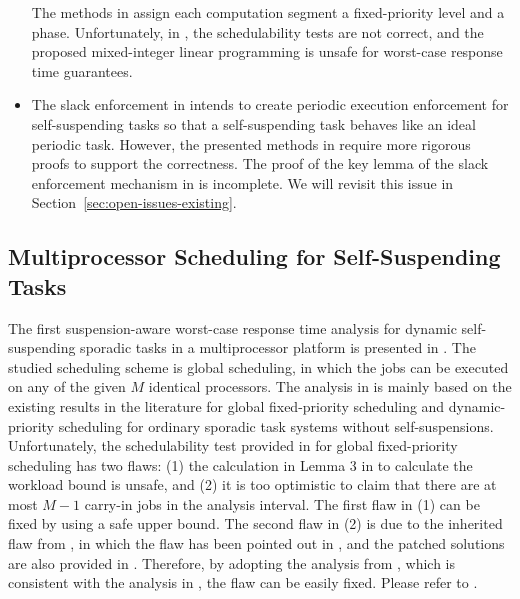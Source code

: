 \begin{table}[t]
\begin{table}[t]
\begin{itemize}
The methods in \cite{RTSS-KimANR13,DBLP:journals/ieicet/DingTT09} assign each computation segment a fixed-priority level and a phase. Unfortunately,  in \cite{RTSS-KimANR13,DBLP:journals/ieicet/DingTT09}, the schedulability tests are not correct, and the proposed mixed-integer linear programming \cite{RTSS-KimANR13} is unsafe for worst-case response time guarantees. 

\item The slack enforcement in \cite{LR:rtas10} intends to create periodic execution enforcement for self-suspending tasks so that a self-suspending task behaves like an ideal periodic task.  However, the presented methods in \cite{LR:rtas10} require more rigorous proofs to support the correctness. The proof of the key lemma of the slack enforcement mechanism in \cite{LR:rtas10} is incomplete. We will revisit this issue in Section~\ref{sec:open-issues-existing}.
  \end{itemize}



\subsection{Multiprocessor Scheduling for Self-Suspending Tasks}
\label{sec:multiprocessor-HRT}
  
The first suspension-aware worst-case response time analysis for dynamic self-suspending sporadic tasks in a multiprocessor platform is presented in \cite{DBLP:conf/ecrts/LiuA13}. 
The studied scheduling scheme is global scheduling, in which the jobs can be executed on any of the given $M$ identical processors. The analysis in \cite{DBLP:conf/ecrts/LiuA13} is mainly based on the existing results in the literature for global fixed-priority scheduling and dynamic-priority scheduling for ordinary sporadic task systems without self-suspensions. Unfortunately, the schedulability test provided in \cite{DBLP:conf/ecrts/LiuA13} for global fixed-priority scheduling has two flaws: (1) the calculation in Lemma 3 in \cite{DBLP:conf/ecrts/LiuA13}  to calculate the workload bound is unsafe, and (2) it is too optimistic to claim that there are at most $M-1$ carry-in jobs in the analysis interval. The first flaw in (1) can be fixed by using a safe upper bound. The second flaw in (2) is due to the inherited flaw from \cite{DBLP:conf/rtss/GuanSYY09}, in which the flaw has been pointed out in \cite{sun2014improving,DBLP:conf/rtns/HuangC15}, and the patched solutions are also provided in \cite{sun2014improving,DBLP:conf/rtns/HuangC15}. Therefore, by adopting the analysis from \cite{DBLP:conf/rtns/HuangC15}, which is consistent with the analysis in \cite{DBLP:conf/ecrts/LiuA13}, the flaw can be easily fixed. Please refer to \cite{erratu-cong-anderson}.
  

\end{table}
\end{table}
